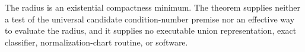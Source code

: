 The radius is an existential compactness minimum. The theorem supplies neither a test of the universal candidate condition-number premise nor an effective way to evaluate the radius, and it supplies no executable union representation, exact classifier, normalization-chart routine, or software.